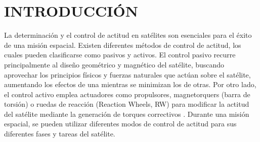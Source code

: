 \section{INTRODUCCIÓN}

La determinación y el control de actitud en satélites son esenciales para el éxito de una misión espacial. Existen diferentes métodos de control de actitud, los cuales pueden clasificarse como pasivos y activos. El control pasivo recurre principalmente al diseño geométrico y magnético del satélite, buscando aprovechar los principios físicos y fuerzas naturales que actúan sobre el satélite, aumentando los efectos de una mientras se minimizan los de otras. Por otro lado, el control activo emplea actuadores como propulsores, magnetorquers (barra de torsión) o ruedas de reacción (Reaction Wheels, RW)  para modificar la actitud del satélite mediante la generación de torques correctivos \cite{Wertz1999}. Durante una misión espacial, se pueden utilizar diferentes modos de control de actitud para sus diferentes fases y tareas del satélite.

